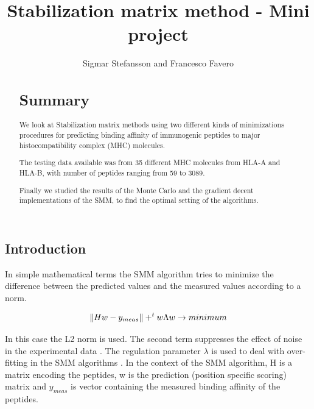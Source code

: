 \documentclass{bioinfo}
\begin{document}
\begin{application}

\title[SMM Project]{Stabilization matrix method - Mini project}
\author[Sigmar Stefansson, Francesco Favero]{Sigmar Stefansson and Francesco Favero}
\address{Danmarks Tekniske Univeristet}



\maketitle

\begin{abstract}

\section{Summary}
We look at Stabilization matrix methods using two different kinds of minimizations procedures \cite{SMM} for predicting binding \cite{netMHC} affinity of immunogenic peptides to major histocompatibility complex \cite{wiki:MHC} (MHC) molecules.
\par The testing data available was from 35 different MHC molecules from HLA-A and HLA-B, with number of peptides ranging from 59 to 3089.
\par Finally we studied the results of the Monte Carlo and the gradient decent implementations of the SMM, to find the optimal setting of the algorithms.

\end{abstract}

\section*{Introduction}

In simple mathematical terms the SMM algorithm tries to minimize the difference between the predicted values and the measured values according to a norm.

\begin{equation}
\label{eq:01}
\| H w - y_{meas}\| + ^tw \Lambda w \rightarrow minimum \\
\end{equation}

In this case the L2 norm is used. The second term suppresses the effect of noise in the experimental data \cite{SMM}. The regulation parameter $\lambda$ is used to deal with over-fitting in the SMM algorithms \cite{wiki:overfit}. In the context of the SMM algorithm, H is a matrix encoding the peptides, w is the prediction (position specific scoring) matrix and $y_{meas}$ is vector containing the measured binding affinity of the peptides.


\end{application}
\end{document}
